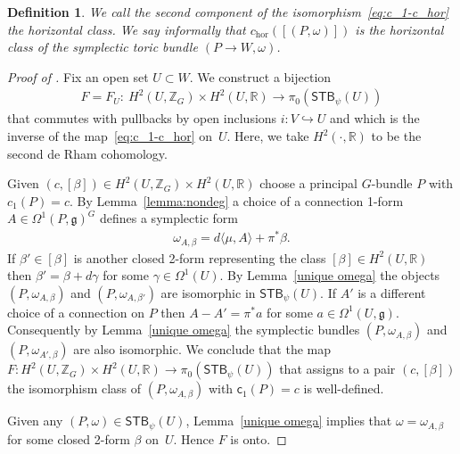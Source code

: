 \documentclass[pdftex]{sigma}
\numberwithin{equation}{section}
\newtheorem{Definition}[Lemma]{Definition}
\begin{document}
\begin{Definition}\sloppy
  We call the second component of the isomorphism~\eqref{eq:c_1-c_hor}
  the {\em horizontal class}. We say informally that
  $c_{\text{hor}}([(P,\omega)])$ is the horizontal class of the symplectic toric
bundle \mbox{$(P\to W, \omega)$}.
\end{Definition}

\begin{proof}[Proof of ]
Fix an open set $U\subset W$.  We construct a bijection
\begin{gather*}
F=F_U\colon \  H^2 (U, {\mathbb Z}_G)\times H^2 (U,{\mathbb R})\to
\pi_0({\textsf{STB}}_\psi (U))
\end{gather*}
that commutes with pullbacks by open inclusions $i\colon V\hookrightarrow U$
and which is the inverse of the map~\eqref{eq:c_1-c_hor} on~$U$.
Here, we take $H^2(\cdot,{\mathbb R})$ to be the second de Rham cohomology.

Given $(c, [\beta]) \in H^2 (U, {\mathbb Z}_G)\times H^2 (U,{\mathbb R}) $ choose a
principal $G$-bundle $P$ with $c_1 (P) = c$.  By
Lemma~\ref{lemma:nondeg} a choice of a connection 1-form $A\in
\Omega^1(P,{\mathfrak g})^G$ def\/ines a symplectic form
\begin{gather*}
\omega_{A,\beta} = d \langle \mu, A\rangle + \pi^*\beta.
\end{gather*}
If $\beta' \in [\beta]$ is another closed 2-form representing the
class $[\beta]\in H^2(U, {\mathbb R})$ then $\beta' = \beta + d\gamma$ for some
$\gamma\in \Omega^1(U)$.  By Lemma~\ref{unique omega} the objects
$(P,\omega_{A,\beta})$ and $(P,\omega_{A,\beta'})$ are isomorphic in
${\textsf{STB}}_\psi (U)$.  If $A'$ is a dif\/ferent choice of a connection on $P$
then $A-A' = \pi^*a$ for some $a\in \Omega^1 (U,{\mathfrak g})$.  Consequently
by Lemma~\ref{unique omega} the symplectic bundles  $(P,\omega_{A, \beta})$ and
$(P,\omega_{A',\beta})$ are also isomorphic.  We conclude that the map
$F\colon H^2 (U, {\mathbb Z}_G)\times H^2 (U,{\mathbb R}) \to \pi_0({\textsf{STB}}_\psi (U))$ that
assigns to a pair $(c,[\beta])$ the isomorphism class of
$(P,\omega_{A,\beta})$ with ${\textsf{c}}_1(P) = c$ is well-def\/ined.

Given any $(P,\omega)\in {\textsf{STB}}_\psi(U)$, Lemma~\ref{unique omega}
implies that $\omega= \omega_{A,\beta}$ for some closed 2-form $\beta$
on~$U$.  Hence $F$ is onto.


\end{proof}
\end{document}
